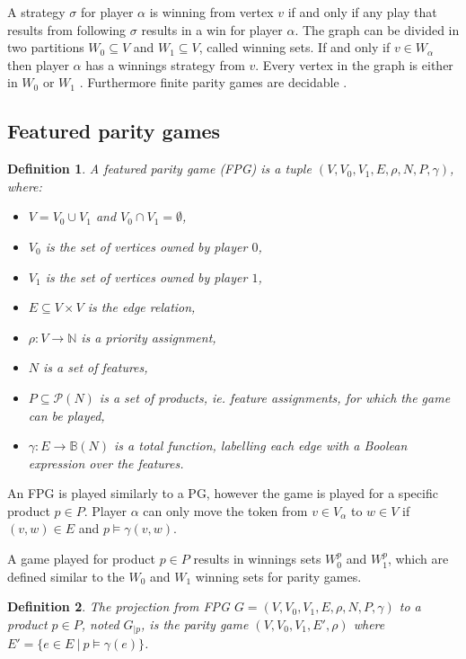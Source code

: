 \documentclass[]{article}
\newtheorem{definition}{Definition}[section]
\begin{document}
A strategy $\sigma$ for player $\alpha$ is winning from vertex $v$ if and only if any play that results from following $\sigma$ results in a win for player $\alpha$. The graph can be divided in two partitions $W_0 \subseteq V$ and $W_1 \subseteq V$, called winning sets. If and only if $v \in W_\alpha$ then player $\alpha$ has a winnings strategy from $v$. Every vertex in the graph is either in $W_0$ or $W_1$ \cite{Bradfield2018}. Furthermore finite parity games are decidable \cite{Bradfield2018}.
\subsection{Featured parity games}
\begin{definition}
	\label{def_FPG}
	A featured parity game (FPG) is a tuple $(V,V_0, V_1, E, \rho, N, P, \gamma)$, where:
	\begin{itemize}
		\item $V = V_0 \cup V_1$ and $V_0 \cap V_1 = \emptyset$,
		\item $V_0$ is the set of vertices owned by player $0$,
		\item $V_1$ is the set of vertices owned by player $1$, 
		\item $E \subseteq V \times V$ is the edge relation,
		\item $\rho :  V \rightarrow \mathbb{N}$ is a priority assignment,
		\item $N$ is a set of features,
		\item $P \subseteq \mathcal{P}(N)$ is a set of products, ie. feature assignments, for which the game can be played,
		\item $\gamma : E \rightarrow \mathbb{B}(N)$ is a total function, labelling each edge with a Boolean expression over the features.
	\end{itemize}
\end{definition}
An FPG is played similarly to a PG, however the game is played for a specific product $p \in P$. Player $\alpha$ can only move the token from $v \in V_\alpha$ to $w \in V$ if $(v,w) \in E$ and $p \models \gamma(v,w)$.

A game played for product $p \in P$ results in winnings sets $W_0^p$ and $W_1^p$, which are defined similar to the $W_0$ and $W_1$ winning sets for parity games.

\begin{definition}
	\label{def_FPG_proj}
The projection from FPG $G = (V,V_0, V_1, E, \rho, N, P, \gamma)$ to a product $p \in P$, noted $G_{|p}$, is the parity game $(V,V_0,V_1, E', \rho)$ where $E' = \{ e \in E\ |\ p \models \gamma(e) \}$.
\end{definition}
\end{document}
